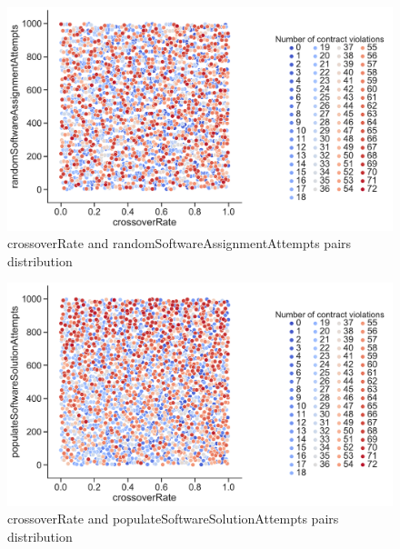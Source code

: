 \begin{figure}
	\centering
	\includegraphics[width=\textwidth]{images/PairsDistr/crossoverRate_randomSoftwareAssignmentAttempts.pdf}
	\caption[crossoverRate and randomSoftwareAssignmentAttempts pairs distribution]{crossoverRate and randomSoftwareAssignmentAttempts pairs distribution}
	\label{fig:crossoverRate_randomSoftwareAssignmentAttempts_pair}
\end{figure}
\clearpage
\begin{figure}
	\centering
	\includegraphics[width=\textwidth]{images/PairsDistr/crossoverRate_populateSoftwareSolutionAttempts.pdf}
	\caption[crossoverRate and populateSoftwareSolutionAttempts pairs distribution]{crossoverRate and populateSoftwareSolutionAttempts pairs distribution}
	\label{fig:crossoverRate_populateSoftwareSolutionAttempts_pair}
\end{figure}
\clearpage
